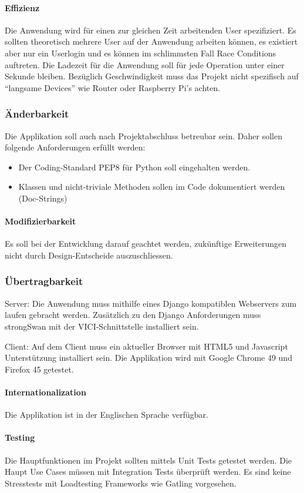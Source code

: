 \paragraph{Effizienz}
Die Anwendung wird für einen zur gleichen Zeit arbeitenden User spezifiziert. Es sollten theoretisch mehrere User auf der Anwendung arbeiten können, es existiert aber nur ein Userlogin und es können im schlimmsten Fall Race Conditions auftreten.
Die Ladezeit für die Anwendung soll für jede Operation unter einer Sekunde bleiben. Bezüglich Geschwindigkeit muss das Projekt nicht spezifisch auf “langsame Devices” wie Router oder Raspberry Pi's achten.

\subsubsection{Änderbarkeit}
Die Applikation soll auch nach Projektabschluss betreubar sein. Daher sollen folgende Anforderungen erfüllt werden: 
\begin{itemize}
	\item Der Coding-Standard PEP8 für Python soll eingehalten werden.
	\item Klassen und nicht-triviale Methoden sollen im Code dokumentiert werden (Doc-Strings)
\end{itemize}

\paragraph{Modifizierbarkeit}
Es soll bei der Entwicklung darauf geachtet werden, zukünftige Erweiterungen nicht durch Design-Entscheide auszuschliessen.


\subsubsection{Übertragbarkeit}
Server: Die Anwendung muss mithilfe eines Django kompatiblen Webservers zum laufen gebracht werden. Zusätzlich zu den Django Anforderungen muss strongSwan mit der VICI-Schnittstelle installiert sein.

Client: Auf dem Client muss ein aktueller Browser mit HTML5 und Javascript Unterstützung installiert sein. Die Applikation wird mit Google Chrome 49 und Firefox 45 getestet.


\paragraph{Internationalization}
Die Applikation ist in der Englischen Sprache verfügbar.

\paragraph{Testing}
Die Hauptfunktionen im Projekt sollten mittels Unit Tests getestet werden. Die Haupt Use Cases müssen mit Integration Tests überprüft werden. Es sind keine Stresstests mit Loadtesting Frameworks wie Gatling vorgesehen.



